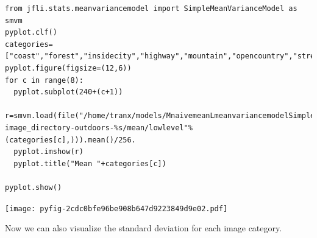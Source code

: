 \documentclass{report}
\begin{document}
\begin{lstlisting}
from jfli.stats.meanvariancemodel import SimpleMeanVarianceModel as smvm
pyplot.clf()
categories=["coast","forest","insidecity","highway","mountain","opencountry","street","tallbuilding"]
pyplot.figure(figsize=(12,6))
for c in range(8):
  pyplot.subplot(240+(c+1))
  r=smvm.load(file("/home/tranx/models/MnaivemeanLmeanvariancemodelSimpleMeanVarianceModel-image_directory-outdoors-%s/mean/lowlevel"%(categories[c],))).mean()/256.
  pyplot.imshow(r)
  pyplot.title("Mean "+categories[c])

pyplot.show()

\end{lstlisting}















\noindent
\texttt{[image: pyfig-2cdc0bfe96be908b647d9223849d9e02.pdf]}






Now we can also visualize the standard deviation for each image category.
\end{document}
